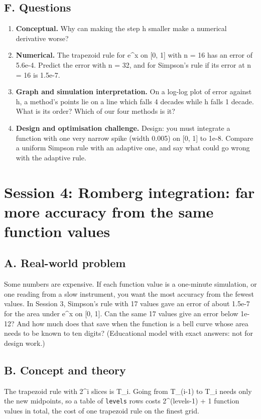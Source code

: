 \documentclass[11pt,a4paper]{article}
\begin{document}
\subsection*{F. Questions}
\begin{enumerate}[nosep]
\item \textbf{Conceptual.} Why can making the step h smaller make a numerical derivative worse?
\item \textbf{Numerical.} The trapezoid rule for e\textasciicircum{}x on [0, 1] with n = 16 has an error of 5.6e-4. Predict the error with n = 32, and for Simpson's rule if its error at n = 16 is 1.5e-7.
\item \textbf{Graph and simulation interpretation.} On a log-log plot of error against h, a method's points lie on a line which falls 4 decades while h falls 1 decade. What is its order? Which of our four methods is it?
\item \textbf{Design and optimisation challenge.} Design: you must integrate a function with one very narrow spike (width 0.005) on [0, 1] to 1e-8. Compare a uniform Simpson rule with an adaptive one, and say what could go wrong with the adaptive rule.
\end{enumerate}

\section{Session 4: Romberg integration: far more accuracy from the same function values}

\subsection*{A. Real-world problem}
Some numbers are expensive. If each function value is a one-minute simulation, or one reading from a slow instrument, you want the most accuracy from the fewest values. In Session 3, Simpson's rule with 17 values gave an error of about 1.5e-7 for the area under e\textasciicircum{}x on [0, 1]. Can the same 17 values give an error below 1e-12? And how much does that save when the function is a bell curve whose area needs to be known to ten digits? (Educational model with exact answers: not for design work.)

\subsection*{B. Concept and theory}
The trapezoid rule with 2\textasciicircum{}i slices is T\_i. Going from T\_(i-1) to T\_i needs only the new midpoints, so a table of \texttt{levels} rows costs 2\textasciicircum{}(levels-1) + 1 function values in total, the cost of one trapezoid rule on the finest grid.
\end{document}
